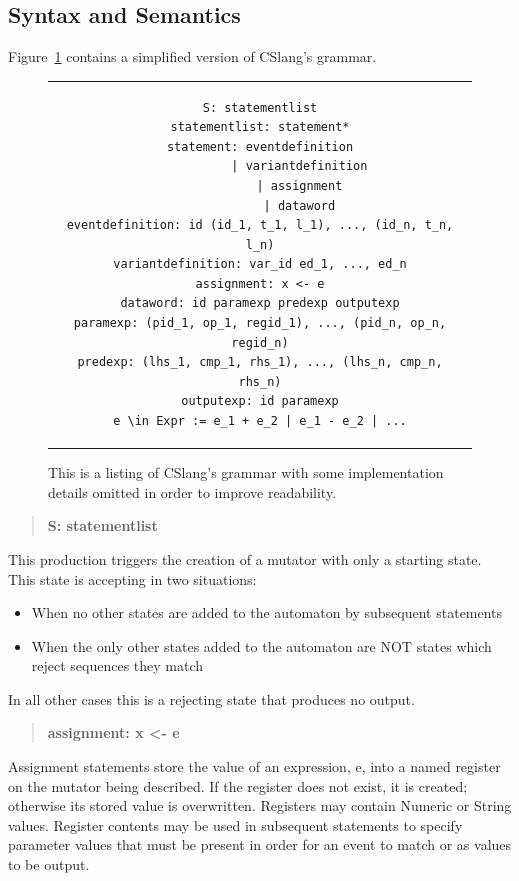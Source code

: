 \subsection{Syntax and Semantics}
\label{sub:SyntaxAndSemantics}

Figure~\ref{lst:SyntaxGrammar} contains a simplified
version of CSlang's grammar.

\begin{figure}[h]
\centering
\begin{tabular}{c}
\begin{lstlisting}
S: statementlist
statementlist: statement*
statement: eventdefinition
           | variantdefinition
           | assignment
           | dataword
eventdefinition: id (id_1, t_1, l_1), ..., (id_n, t_n, l_n)
variantdefinition: var_id ed_1, ..., ed_n
assignment: x <- e
dataword: id paramexp predexp outputexp
paramexp: (pid_1, op_1, regid_1), ..., (pid_n, op_n, regid_n)
predexp: (lhs_1, cmp_1, rhs_1), ..., (lhs_n, cmp_n, rhs_n)
outputexp: id paramexp
e \in Expr := e_1 + e_2 | e_1 - e_2 | ...
\end{lstlisting}
\end{tabular}
\caption{This is a listing of CSlang's grammar with some implementation
  details omitted in order to improve readability.}
\label{lst:SyntaxGrammar}
\end{figure}


\begin{quote}
\centering
\textbf{S: statementlist}
\end{quote}

This production triggers the creation of a mutator with only a starting
state.  This state is accepting in two situations:
\begin{itemize}
  \item{When no other states are added to the automaton by subsequent
    statements}
  \item{When the only other states added to the automaton are NOT states
    which reject sequences they match}
\end{itemize}
In all other cases this is a rejecting state that produces no output.

\begin{quote}
\centering
\textbf{assignment: x <- e}
\end{quote}

Assignment statements store the value of an expression, e, into a named
register on the mutator being described.
If the register does not exist,
it is created;
otherwise its stored value is overwritten.
Registers may contain Numeric or String values.  Register contents
may be used in subsequent statements to specify parameter values that must
be present in order for an event to match or as values to be output.

